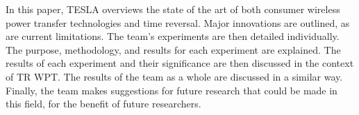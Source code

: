 In this paper, TESLA overviews the state of the art of both consumer wireless
power transfer technologies and time reversal.  Major innovations are outlined,
as are current limitations.  The team's experiments are then detailed
individually.  The purpose, methodology, and results for each experiment are
explained.  The results of each experiment and their significance are then
discussed in the context of TR WPT.  The results of the team as a whole are
discussed in a similar way.  Finally, the team makes suggestions for future
research that could be made in this field, for the benefit of future
researchers.
